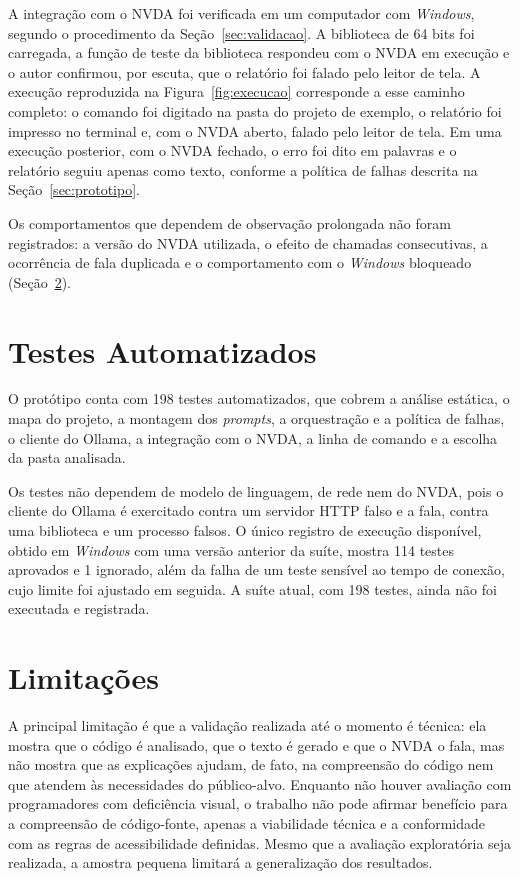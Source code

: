 \documentclass[
    12pt,                   %
    openright,              %
    oneside,                %
    a4paper,                %
    sumario=tradicional,    %
    english,                %
    brazil,                 %
    ]{abntex2}
\begin{document}
A integração com o NVDA foi verificada em um computador com \textit{Windows}, segundo o procedimento da Seção~\ref{sec:validacao}. A biblioteca de 64 bits foi carregada, a função de teste da biblioteca respondeu com o NVDA em execução e o autor confirmou, por escuta, que o relatório foi falado pelo leitor de tela. A execução reproduzida na Figura~\ref{fig:execucao} corresponde a esse caminho completo: o comando foi digitado na pasta do projeto de exemplo, o relatório foi impresso no terminal e, com o NVDA aberto, falado pelo leitor de tela. Em uma execução posterior, com o NVDA fechado, o erro foi dito em palavras e o relatório seguiu apenas como texto, conforme a política de falhas descrita na Seção~\ref{sec:prototipo}.

Os comportamentos que dependem de observação prolongada não foram registrados: a versão do NVDA utilizada, o efeito de chamadas consecutivas, a ocorrência de fala duplicada e o comportamento com o \textit{Windows} bloqueado (Seção~\ref{sec:limitacoes}).

\section{Testes Automatizados}\label{sec:resulttestes}

O protótipo conta com 198 testes automatizados, que cobrem a análise estática, o mapa do projeto, a montagem dos \textit{prompts}, a orquestração e a política de falhas, o cliente do Ollama, a integração com o NVDA, a linha de comando e a escolha da pasta analisada.

Os testes não dependem de modelo de linguagem, de rede nem do NVDA, pois o cliente do Ollama é exercitado contra um servidor HTTP falso e a fala, contra uma biblioteca e um processo falsos. O único registro de execução disponível, obtido em \textit{Windows} com uma versão anterior da suíte, mostra 114 testes aprovados e 1 ignorado, além da falha de um teste sensível ao tempo de conexão, cujo limite foi ajustado em seguida. A suíte atual, com 198 testes, ainda não foi executada e registrada.

\section{Limitações}\label{sec:limitacoes}

A principal limitação é que a validação realizada até o momento é técnica: ela mostra que o código é analisado, que o texto é gerado e que o NVDA o fala, mas não mostra que as explicações ajudam, de fato, na compreensão do código nem que atendem às necessidades do público-alvo. Enquanto não houver avaliação com programadores com deficiência visual, o trabalho não pode afirmar benefício para a compreensão de código-fonte, apenas a viabilidade técnica e a conformidade com as regras de acessibilidade definidas. Mesmo que a avaliação exploratória seja realizada, a amostra pequena limitará a generalização dos resultados.
\end{document}
